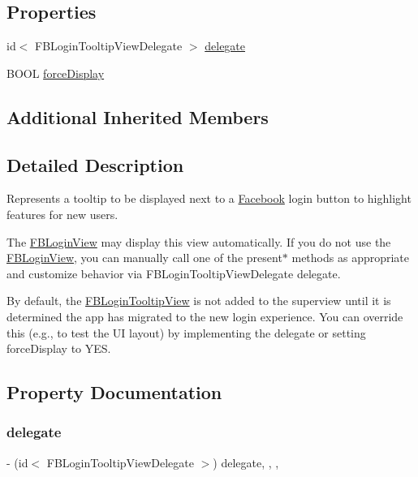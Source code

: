 \subsection*{Properties}
\begin{DoxyCompactItemize}
\item 
id$<$ F\+B\+Login\+Tooltip\+View\+Delegate $>$ \hyperlink{interfaceFBLoginTooltipView_a07fa6e31f14940ef41f87e938a5fe5d6}{delegate}
\item 
B\+O\+OL \hyperlink{interfaceFBLoginTooltipView_a98970e89f2bb1476b33ee20a0d525ea0}{force\+Display}
\end{DoxyCompactItemize}
\subsection*{Additional Inherited Members}


\subsection{Detailed Description}
Represents a tooltip to be displayed next to a \hyperlink{interfaceFacebook}{Facebook} login button to highlight features for new users.

The {\ttfamily \hyperlink{interfaceFBLoginView}{F\+B\+Login\+View}} may display this view automatically. If you do not use the {\ttfamily \hyperlink{interfaceFBLoginView}{F\+B\+Login\+View}}, you can manually call one of the {\ttfamily present$\ast$} methods as appropriate and customize behavior via {\ttfamily F\+B\+Login\+Tooltip\+View\+Delegate} delegate.

By default, the {\ttfamily \hyperlink{interfaceFBLoginTooltipView}{F\+B\+Login\+Tooltip\+View}} is not added to the superview until it is determined the app has migrated to the new login experience. You can override this (e.\+g., to test the UI layout) by implementing the delegate or setting {\ttfamily force\+Display} to Y\+ES. 

\subsection{Property Documentation}
\mbox{\label{interfaceFBLoginTooltipView_a07fa6e31f14940ef41f87e938a5fe5d6}} 
\subsubsection{\texorpdfstring{delegate}{delegate}}
{\footnotesize\ttfamily -\/ (id$<$ F\+B\+Login\+Tooltip\+View\+Delegate $>$) delegate\hspace{0.3cm}{\ttfamily [read]}, {\ttfamily [write]}, {\ttfamily [nonatomic]}, {\ttfamily [assign]}}

